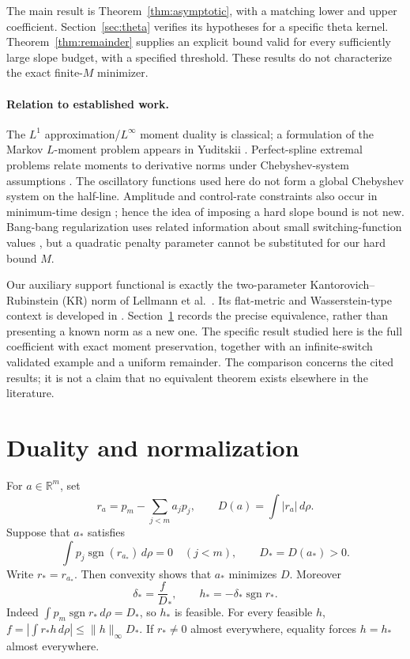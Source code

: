 \documentclass[11pt,a4paper]{article}
\numberwithin{equation}{section}
\theoremstyle{remark}\newtheorem{remark}[theorem]{Remark}
\DeclareMathOperator{\sgn}{sgn}
\newcommand{\R}{\mathbb R}
\newcommand{\ds}{\delta_*}
\newcommand{\Ds}{D_*}
\newcommand{\rs}{r_*}
\newcommand{\norm}[1]{\lVert#1\rVert}
\begin{document}
The main result is Theorem~\ref{thm:asymptotic}, with a matching lower and
upper coefficient. Section~\ref{sec:theta} verifies its hypotheses for a
specific theta kernel. Theorem~\ref{thm:remainder} supplies an explicit
bound valid for every sufficiently large slope budget, with a specified
threshold. These results do not characterize the exact finite-$M$
minimizer.

\paragraph{Relation to established work.}
The $L^1$ approximation/$L^\infty$ moment duality is classical; a formulation
of the Markov $L$-moment problem appears in Yuditskii
\cite[Problems 1.2--1.3]{yuditskii}. Perfect-spline extremal problems relate
moments to derivative norms under Chebyshev-system assumptions
\cite[Sections 7--8]{karlin}. The oscillatory functions used here do not
form a global Chebyshev system on the half-line. Amplitude and control-rate
constraints also occur in minimum-time design \cite{albassam}; hence the
idea of imposing a hard slope bound is not new. Bang-bang regularization
uses related information about small switching-function values
\cite{wachsmuth}, but a quadratic penalty parameter cannot be substituted
for our hard bound $M$.

Our auxiliary support functional is exactly the two-parameter
Kantorovich--Rubinstein (KR) norm of Lellmann et al.\ \cite{lellmann}.
Its flat-metric and Wasserstein-type context is developed in
\cite{piccoli,schmitzer}. Section~\ref{sec:dual} records the precise
equivalence, rather than presenting a known norm as a new one. The specific
result studied here is the full coefficient with exact moment preservation,
together with an infinite-switch validated example and a uniform remainder.
The comparison concerns the cited results; it is not a claim that no
equivalent theorem exists elsewhere in the literature.

\section{Duality and normalization}\label{sec:dual}
For $a\in\R^m$, set
\begin{equation}
 r_a=p_m-\sum_{j<m}a_jp_j,\qquad D(a)=\int|r_a|\,d\rho.\label{eq:residual}
\end{equation}
Suppose that $a_*$ satisfies
\begin{equation}
 \int p_j\sgn(r_{a_*})\,d\rho=0\quad(j<m),\qquad
 \Ds=D(a_*)>0.\label{eq:signmoments}
\end{equation}
Write $\rs=r_{a_*}$. Then convexity shows that $a_*$ minimizes $D$.
Moreover
\begin{equation}
 \ds=\frac f\Ds,\qquad h_*=-\ds\sgn\rs.\label{eq:bangbang}
\end{equation}
Indeed $\int p_m\sgn\rs\,d\rho=\Ds$, so $h_*$ is feasible. For every
feasible $h$, $f=|\int\rs h\,d\rho|\le\norm h_\infty\Ds$.
If $\rs\ne0$ almost everywhere, equality forces $h=h_*$ almost everywhere.
\end{document}
